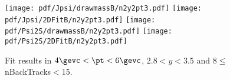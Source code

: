 \begin{figure}[H]
\begin{center}
\texttt{[image: pdf/Jpsi/drawmassB/n2y2pt3.pdf]}
\texttt{[image: pdf/Jpsi/2DFitB/n2y2pt3.pdf]}
\vspace*{-0.5cm}
\texttt{[image: pdf/Psi2S/drawmassB/n2y2pt3.pdf]}
\texttt{[image: pdf/Psi2S/2DFitB/n2y2pt3.pdf]}
\vspace*{-0.5cm}
\end{center}
\caption{Fit results in $4\gevc<\pt<6\gevc$, $2.8<y<3.5$ and 8$\leq$nBackTracks$<$15.}
\label{Fitn2y2pt3}
\end{figure}
